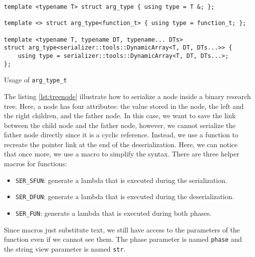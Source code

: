 \begin{listing}[ht!]
\begin{verbatim}
template <typename T> struct arg_type { using type = T &; };

template <> struct arg_type<function_t> { using type = function_t; };

template <typename T, typename DT, typename... DTs>
struct arg_type<serializer::tools::DynamicArray<T, DT, DTs...>> {
    using type = serializer::tools::DynamicArray<T, DT, DTs...>;
};
\end{verbatim}
\caption{Usage of \texttt{arg\_type\_t}}
\label{lst:mlargtype}
\end{listing}

The listing \ref{lst:treenode} illustrate how to serialize a node inside a
binary research tree. Here, a node has four attributes: the value stored in the
node, the left and the right children, and the father node. In this case, we
want to save the link between the child node and the father node, however, we
cannot serialize the father node directly since it is a cyclic reference.
Instead, we use a function to recreate the pointer link at the end of the
deserialization. Here, we can notice that once more, we use a macro to simplify
the syntax. There are three helper macros for functions:

\begin{itemize}
  \item \texttt{SER\_SFUN}: generate a lambda that is executed during the
    serialization.
  \item \texttt{SER\_DFUN}: generate a lambda that is executed during the
    deserialization.
  \item \texttt{SER\_FUN}: generate a lambda that is executed during both
    phases.
\end{itemize}

Since macros just substitute text, we still have access to the parameters of the
function even if we cannot see them. The phase parameter is named \texttt{phase}
and the string view parameter is named \texttt{str}.

